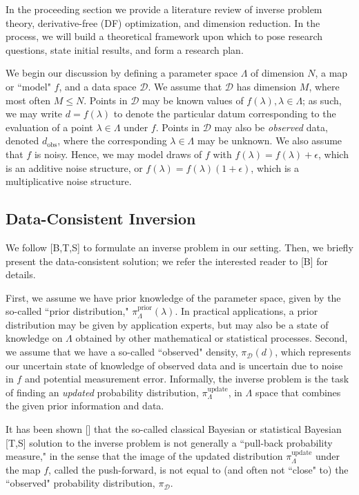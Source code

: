 \documentclass{amsart}
\begin{document}
In the proceeding section we provide a literature review of inverse problem theory, derivative-free (DF) optimization, and dimension reduction. In the process, we will build a theoretical framework upon which to pose research questions, state initial results, and form a research plan. 

We begin our discussion by defining a parameter space $\Lambda$ of dimension $N$, a map or ``model" $f$, and a data space $\mathcal{D}$. We assume that $\mathcal{D}$ has dimension $M$, where most often $M\leq N$. Points in $\mathcal{D}$ may be known values of $f(\lambda), \lambda\in \Lambda$; as such, we may write $d=f(\lambda)$ to denote the particular datum corresponding to the evaluation of a point $\lambda \in \Lambda$ under $f$. Points in $\mathcal{D}$ may also be \textit{observed} data, denoted $d_{\text{obs}}$, where the corresponding $\lambda\in \Lambda$ may be unknown. We also assume that $f$ is noisy. Hence, we may model draws of $f$ with $f(\lambda)=f(\lambda)+\epsilon$, which is an additive noise structure, or $f(\lambda)=f(\lambda)(1+\epsilon)$, which is a multiplicative noise structure.


\subsection{Data-Consistent Inversion}


We follow [B,T,S] to formulate an inverse problem in our setting. Then, we briefly present the data-consistent solution; we refer the interested reader to [B] for details.

First, we assume we have prior knowledge of the parameter space, given by the so-called ``prior distribution," $\pi_\Lambda^\text{prior}(\lambda)$. In practical applications, a prior distribution may be given by application experts, but may also be a state of knowledge on $\Lambda$ obtained by other mathematical or statistical processes. Second, we assume that we have a so-called ``observed" density, $\pi_\mathcal{D}(d)$, which represents our uncertain state of knowledge of observed data and is uncertain due to noise in $f$ and potential measurement error. Informally, the inverse problem is the task of finding an \textit{updated} probability distribution, $\pi_\Lambda^\text{update}$, in $\Lambda$ space that combines the given prior information and data.

It has been shown [] that the so-called classical Bayesian or statistical Bayesian [T,S] solution to the inverse problem is not generally a ``pull-back probability measure," in the sense that the image of the updated distribution $\pi_\Lambda^\text{update}$ under the map $f$, called the push-forward, is not equal to (and often not ``close" to) the ``observed" probability distribution, $\pi_\mathcal{D}$. 
\end{document}
